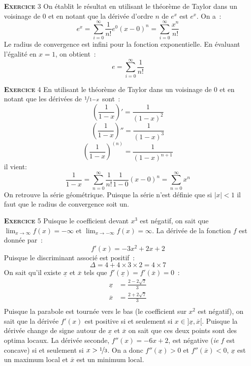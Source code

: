 \documentclass[10pt,a4paper,notitlepage]{article}
\newcommand{\exercice}[1]{\textsc{\textbf{Exercice}} #1}
\begin{document}
\bigskip

\exercice{3} On établit le résultat en utilisant le théorème de Taylor
dans un voisinage de 0 et en notant que la dérivée d'ordre $n$ de
$e^x$ est $e^x$. On a :
\[
e^{x} = \sum_{i=0}^{\infty} \frac{1}{n!}e^0(x-0)^n = \sum_{i=0}^{\infty} \frac{x^n}{n!}
\]
Le radius de convergence est infini pour la fonction exponentielle. En
évaluant l'égalité en $x=1$, on obtient :
\[
e = \sum_{i=0}^{\infty} \frac{1}{n!}
\]

\bigskip

\exercice{4} En utilisant le théorème de Taylor dans un voisinage de 0
et en notant que les dérivées de $\nicefrac{1}{1-x}$ sont :
\[
\left(\frac{1}{1-x}\right)' = \frac{1}{(1-x)^2} 
\]
\[
\left(\frac{1}{1-x}\right)'' = \frac{1}{(1-x)^3} 
\]
\[
\left(\frac{1}{1-x}\right)^{(n)} = \frac{1}{(1-x)^{n+1}} 
\]
il vient:
\[
\frac{1}{1-x} = \sum_{n=0}^{\infty} \frac{1}{n!}\frac{1}{1-0}(x-0)^n = \sum_{n=0}^{\infty} x^n
\]
On retrouve la série géométrique. Puisque la série n'est définie que
si $|x|<1$ il faut que le radius de convergence soit un.

\bigskip

\exercice{5} Puisque le coefficient devant $x^3$ est négatif, on sait
que $\lim_{x\rightarrow\infty}f(x)=-\infty$ et $\lim_{x\rightarrow
  -\infty}f(x)=\infty$. La dérivée de la fonction $f$ est donnée par :
\[
f'(x) = -3x^2+2x+2
\]
Puisque le discriminant associé est positif :
\[
\Delta = 4+4\times 3 \times 2 = 4 \times 7
\]
On sait qu'il existe $\underline x$ et $\overline x$ tels que
$f'(\underline x) = f'(\overline x) = 0$ :
\[
\begin{split}
\underline x &= \frac{2-2\sqrt{7}}{3}\\
\overline x &= \frac{2+2\sqrt{7}}{3}\\
\end{split}
\]
Puisque la parabole est tournée vers le bas (le coefficient sur $x^2$
est négatif), on sait que la dérivée $f'(x)$ est positive si et
seulement si $x\in]\underline x, \overline x[$. Puisque la dérivée
change de signe autour de $\underline x$ et $\overline x$ on sait que
ces deux points sont des optima locaux. La dérivée seconde,
$f''(x)=-6x+2$, est négative (\emph{ie} $f$ est concave) si et
seulement si
$x>\nicefrac{1}{3}$. On a donc $f''(\underline{x})>0$ et
$f''(\overline{x})<0$, $\underline{x}$ est un maximum local et   
$\overline{x}$ est un minimum local.

\bigskip
\end{document}
